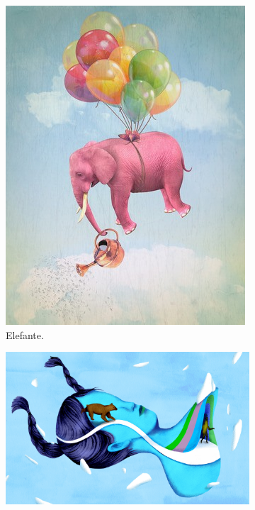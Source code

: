 \documentclass[
]{article}
\begin{document}
\begin{figure}
  \centering
  \begin{subfigure}{0.3\textwidth}

\begin{center}\includegraphics[width=0.8\linewidth]{image/elefante} \end{center}

\caption{Elefante.}
\label{sub:elefant}
\end{subfigure}
\begin{subfigure}{0.3\textwidth}

\begin{center}\includegraphics[width=0.8\linewidth]{image/daydreaming5final} \end{center}


\end{subfigure}
\end{figure}
\end{document}
